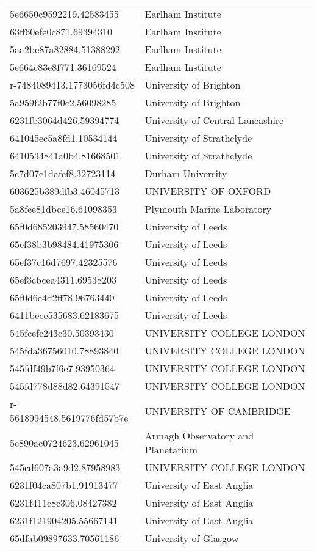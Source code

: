 \begin{tabular}{ll}
5e6650c9592219.42583455 & Earlham Institute \\
63ff60efe0c871.69394310 & Earlham Institute \\
5aa2be87a82884.51388292 & Earlham Institute \\
5e664c83e8f771.36169524 & Earlham Institute \\
r-7484089413.1773056fd4c508 & University of Brighton \\
5a959f2b77f0c2.56098285 & University of Brighton \\
6231fb3064d426.59394774 & University of Central Lancashire \\
641045ec5a8fd1.10534144 & University of Strathclyde \\
6410534841a0b4.81668501 & University of Strathclyde \\
5c7d07e1dafef8.32723114 & Durham University \\
603625b389dfb3.46045713 & UNIVERSITY OF OXFORD \\
5a8fee81dbce16.61098353 & Plymouth Marine Laboratory \\
65f0d685203947.58560470 & University of Leeds \\
65ef38b3b98484.41975306 & University of Leeds \\
65ef37c16d7697.42325576 & University of Leeds \\
65ef3cbcea4311.69538203 & University of Leeds \\
65f0d6e4d2ff78.96763440 & University of Leeds \\
6411beee535683.62183675 & University of Leeds \\
545fcefc243c30.50393430 & UNIVERSITY COLLEGE LONDON \\
545fda36756010.78893840 & UNIVERSITY COLLEGE LONDON \\
545fdf49b7f6e7.93950364 & UNIVERSITY COLLEGE LONDON \\
545fd778d88d82.64391547 & UNIVERSITY COLLEGE LONDON \\
r-5618994548.5619776fd57b7e & UNIVERSITY OF CAMBRIDGE \\
5c890ac0724623.62961045 & Armagh Observatory and Planetarium \\
545cd607a3a9d2.87958983 & UNIVERSITY COLLEGE LONDON \\
6231f04ca807b1.91913477 & University of East Anglia \\
6231f411c8c306.08427382 & University of East Anglia \\
6231f121904205.55667141 & University of East Anglia \\
65dfab09897633.70561186 & University of Glasgow \\

\end{tabular}
